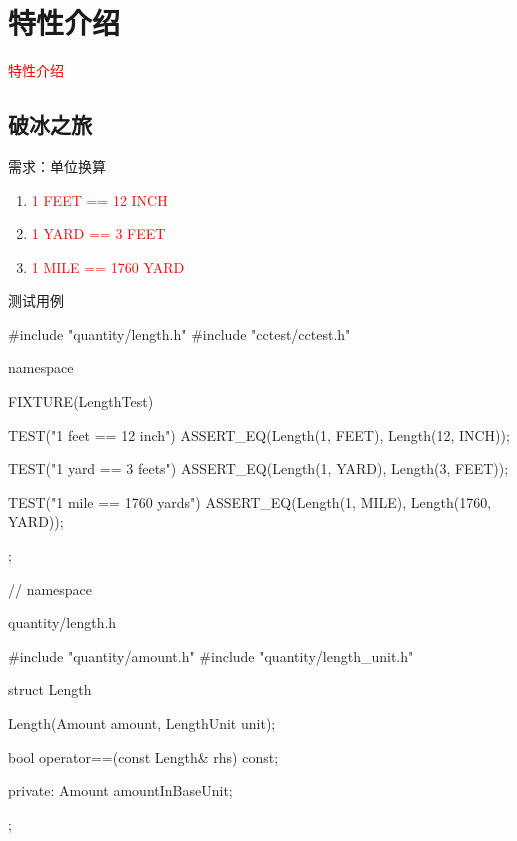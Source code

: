 \section{特性介绍}
\label{sec:features}

\begin{frame}
  \begin{center}
    \Huge{\textcolor{red}{特性介绍}}
  \end{center}
\end{frame}

\subsection{破冰之旅}

\begin{frame}{需求：单位换算}
  \begin{enumerate}
    \item \textcolor{red}{1 FEET == 12 INCH}
    \item \textcolor{red}{1 YARD == 3 FEET}
    \item \textcolor{red}{1 MILE == 1760 YARD}
  \end{enumerate}
\end{frame}

\begin{frame}[fragile]{测试用例}
\begin{c++}
#include "quantity/length.h"
#include "cctest/cctest.h"

namespace {

FIXTURE(LengthTest) {
  TEST("1 feet == 12 inch") {
    ASSERT_EQ(Length(1, FEET), Length(12, INCH));
  }

  TEST("1 yard == 3 feets") {
    ASSERT_EQ(Length(1, YARD), Length(3, FEET));
  }

  TEST("1 mile == 1760 yards") {
    ASSERT_EQ(Length(1, MILE), Length(1760, YARD));
  }
};

} // namespace
\end{c++}
\end{frame}

\begin{frame}[fragile]{quantity/length.h}
\begin{c++}
#include "quantity/amount.h"
#include "quantity/length_unit.h"

struct Length {
  Length(Amount amount, LengthUnit unit);

  bool operator==(const Length& rhs) const;

private:
  Amount amountInBaseUnit;
};
\end{c++}
\end{frame}

